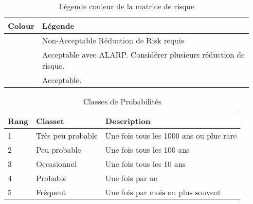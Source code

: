 \documentclass[12pt]{article}
\begin{document}
 

\begin{table}[H]
\centering
\caption{Légende couleur de la matrice de risque}
\begin{tabular}{|p{2cm}|p{10cm}|}
\hline \bf Colour & \bf Légende \\
\hline \cellcolor{red! 50} & Non-Acceptable Réduction de Risk requis \\ [10pt]
\hline \cellcolor{yellow! 50} & Acceptable avec ALARP. Considérer plusieurs réduction de risque. \\[10pt]
\hline \cellcolor{green! 50} & Acceptable. \\ [10pt]
\hline
\end{tabular}
\end{table}

 
\begin{table}[H]
\centering
\caption{Classes de Probabilités}
\begin{tabular}{ p{2cm} p{3cm} p{8cm}}
\hline \bf Rang & \bf Classet & \bf Description \\
\hline 1 & Très peu probable & Une fois tous les 1000 ans ou plus rare \\
2 & Peu probable & Une fois tous les 100 ans \\
3 & Occasionnel & Une fois tous les 10 ans\\
4 & Probable & Une fois par an\\
5 & Fréquent & Une fois par mois ou plus souvent \\

\hline

\end{tabular}
\end{table}
\end{document}
